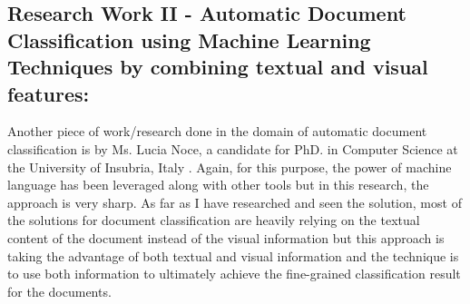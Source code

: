 \subsection{Research Work II - Automatic Document Classification using Machine Learning Techniques by combining textual and visual features:}
Another piece of work/research done in the domain of automatic document classification is by Ms. Lucia Noce, a candidate for PhD. in Computer Science at the University of Insubria, Italy \cite{Noce2016DocumentIC}. Again, for this purpose, the power of machine language has been leveraged along with other tools but in this research, the approach is very sharp. As far as I have researched and seen the solution, most of the solutions for document classification are heavily relying on the textual content of the document instead of the visual information but this approach is taking the advantage of both textual and visual information and the technique is to use both information to ultimately achieve the fine-grained classification result for the documents.
\par
